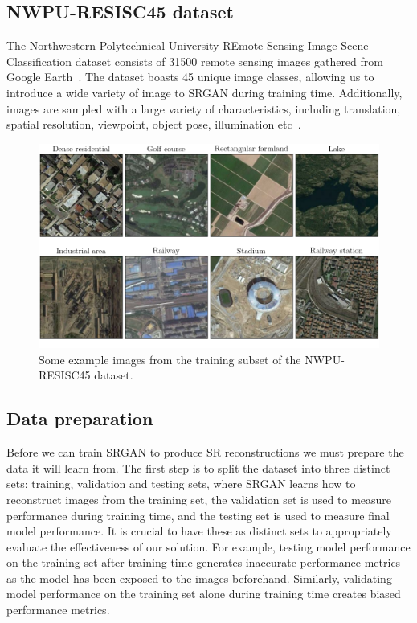 \subsection{NWPU-RESISC45 dataset}\label{subsec:resisc45}
The Northwestern Polytechnical University REmote Sensing Image Scene Classification dataset consists of 31500 remote sensing images gathered from Google Earth~\cite{resisc45}. The dataset boasts 45 unique image classes, allowing us to introduce a wide variety of image to SRGAN during training time. Additionally, images are sampled with a large variety of characteristics, including translation, spatial resolution, viewpoint, object pose, illumination etc~\cite{resisc45}.
\begin{figure}
    \includegraphics[width=\linewidth]{./assets/resisc45_example.png}
    \caption{Some example images from the training subset of the NWPU-RESISC45 dataset.}
    \label{fig:resisc45_examples}
\end{figure}

\subsection{Data preparation}\label{subsec:data_preparation}
Before we can train SRGAN to produce SR reconstructions we must prepare the data it will learn from. The first step is to split the dataset into three distinct sets: training, validation and testing sets, where SRGAN learns how to reconstruct images from the training set, the validation set is used to measure performance during training time, and the testing set is used to measure final model performance. It is crucial to have these as distinct sets to appropriately evaluate the effectiveness of our solution. For example, testing model performance on the training set after training time generates inaccurate performance metrics as the model has been exposed to the images beforehand. Similarly, validating model performance on the training set alone during training time creates biased performance metrics.

